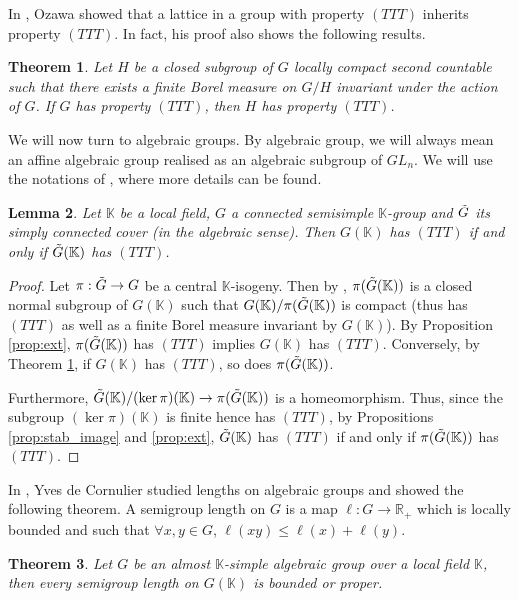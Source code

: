 \documentclass{article}
\newtheorem{theorem}{Theorem}[section]
\newtheorem{lem}[theorem]{Lemma}
\theoremstyle{definition}
\theoremstyle{remark}
\numberwithin{equation}{section}
\newcommand{\R}{\mathbb{R}}
\newcommand{\K}{\mathbb{K}}
\begin{document}
In \cite[Thm. 6]{Ozawa+2011+89+104}, Ozawa showed that a lattice in a group with property $(TTT)$ inherits property $(TTT)$. In fact, his proof also shows the following results.
\begin{theorem}{\cite[Thm. 6]{Ozawa+2011+89+104}}\label{lem:cocompactsubgroup}
    Let $H$ be a closed subgroup of $G$ locally compact second countable such that there exists a finite Borel measure on $G/H$ invariant under the action of $G$. If $G$ has property $(TTT)$, then $H$ has property $(TTT)$.
\end{theorem}

We will now turn to algebraic groups. By algebraic group, we will always mean an affine algebraic group realised as an algebraic subgroup of $GL_n$. We will use the notations of \cite[Ch. I]{margulis1991discrete}, where more details can be found.

\begin{lem}\label{lem:simplyconnected}
    Let $\K$ be a local field, $G$ a connected semisimple $\K$-group and $\Tilde{G}$ its simply connected cover (in the algebraic sense). Then $G(\K)$ has $(TTT)$ if and only if $\Tilde{G}(\K)$ has $(TTT)$.
\end{lem}

\begin{proof}
    Let $\pi:\Tilde{G}\to G$ be a central $\K$-isogeny. Then by \cite[Ch. I, Thm. 2.3.4]{margulis1991discrete}, $\pi(\Tilde{G}(\K))$ is a closed normal subgroup of $G(\K)$ such that $G(\K)/\pi(\Tilde{G}(\K))$ is compact (thus has $(TTT)$ as well as a finite Borel measure invariant by $G(\K)$). By Proposition \ref{prop:ext}, $\pi(\Tilde{G}(\K))$ has $(TTT)$ implies $G(\K)$ has $(TTT)$. Conversely, by Theorem \ref{lem:cocompactsubgroup}, if $G(\K)$ has $(TTT)$, so does $\pi(\Tilde{G}(\K))$.\medskip
    
    Furthermore, $\Tilde{G}(\K)/(\ker\pi)(\K)\to \pi(\Tilde{G}(\K))$ is a homeomorphism. Thus, since the subgroup $(\ker\pi)(\K)$ is finite hence has $(TTT)$, by Propositions \ref{prop:stab_image} and \ref{prop:ext}, $\Tilde{G}(\K)$ has $(TTT)$ if and only if $\pi(\Tilde{G}(\K))$ has $(TTT)$.
\end{proof}

In \cite{cornulier}, Yves de Cornulier studied lengths on algebraic groups and showed the following theorem. A semigroup length on $G$ is a map $\ell:G\to \R_+$ which is locally bounded and such that $\forall x,y\in G$, $\ell(xy)\leq \ell(x)+\ell(y)$.
\begin{theorem}{\cite[Thm. 1.4]{cornulier}}
    Let $G$ be an almost $\mathbb{K}$-simple algebraic group over a local field $\mathbb{K}$, then every semigroup length on $G(\mathbb{K})$ is bounded or proper. 
\end{theorem}
\end{document}
